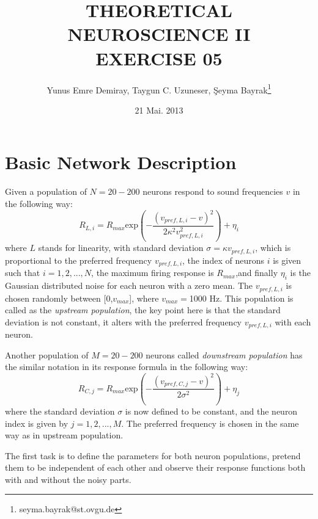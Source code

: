 \documentclass{article}
\begin{document}
\title{THEORETICAL NEUROSCIENCE II \\ EXERCISE 05}
\date{21 Mai. 2013}
\author[1]{Yunus Emre Demiray, Taygun C. Uzuneser, \c{S}eyma Bayrak\thanks{seyma.bayrak@st.ovgu.de}}
\maketitle

\newpage

\section{Basic Network Description}
Given a population of $N=20-200$ neurons respond to sound frequencies $v$ in the following way:
\begin{equation}
 R_{L,i}=R_{max}\text{exp}(-\dfrac{(v_{pref,L,i}-v)^2}{2\kappa^2v_{pref,L,i}^2})+\eta_i
\end{equation}
where $L$ stands for linearity, with standard deviation $\sigma=\kappa v_{pref,L,i}$, which is proportional to the preferred frequency $v_{pref,L,i}$, the index of neurons $i$ is given such that $i={1,2,...,N}$, the maximum firing response is $R_{max}$,and finally $\eta_i$ is the Gaussian distributed noise for each neuron with a zero mean. The $v_{pref,L,i}$ is chosen randomly between [0,$v_{max}$], where $v_{max}=$1000 Hz. This population is called as the \textit{upstream population}, the key point here is that the standard deviation is not constant, it alters with the preferred frequency $v_{pref,L,i}$ with each neuron.

Another population of $M=20-200$ neurons called \textit{downstream population} has the similar notation in its response formula in the following way:
\begin{equation}
 R_{C,j}=R_{max}\text{exp}(-\dfrac{(v_{pref,C,j}-v)^2}{2\sigma^2})+\eta_j
\end{equation}
where the standard deviation $\sigma$ is now defined to be constant, and the neuron index is given by $j=1,2,...,M$. The preferred frequency is chosen in the same way as in upstream population.

The first task is to define the parameters for both neuron populations, pretend them to be independent of each other and observe their response functions both with and without the noisy parts.
\end{document}
